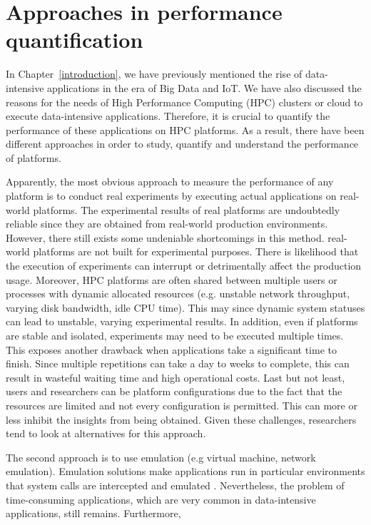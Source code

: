 \section{Approaches in performance quantification}

In Chapter~\ref{introduction}, we have previously mentioned the 
rise of data-intensive applications in the era of Big Data and IoT.
We have also discussed the reasons for the needs of High Performance 
Computing (HPC) clusters or cloud to execute data-intensive applications.
Therefore, it is crucial to quantify the performance of these applications 
on HPC platforms. As a result, there have been different approaches 
in order to study, quantify and understand the performance of platforms.

Apparently, the most obvious approach to measure the performance 
of any platform is to conduct real experiments by executing actual 
applications on real-world platforms. 
The experimental results of real platforms are undoubtedly reliable 
since they are obtained from real-world production environments. 
However, there still exists some undeniable shortcomings in this method. 
 real-world platforms are not built for 
experimental purposes. 
There is likelihood that the execution of experiments can interrupt 
or detrimentally affect the production usage. 
Moreover, HPC platforms are often shared between multiple users or processes 
with dynamic allocated resources (e.g. unstable network throughput,  
varying disk bandwidth, idle CPU time). 
This may  since 
dynamic system statuses can lead to unstable, varying experimental results. 
In addition, even if platforms are stable and isolated, experiments may need 
to be executed multiple times. 
This exposes another drawback when applications take a significant time 
to finish. Since multiple repetitions can take a day to weeks to complete, 
this can result in wasteful waiting time and high operational costs.  
Last but not least, users and researchers can be  platform 
configurations due to the fact that the resources are limited and 
not every configuration is permitted. This can more or less 
inhibit the insights from being obtained. 
Given these challenges, researchers tend to look at alternatives 
for this approach. 

The second approach is to use emulation (e.g virtual machine, 
network emulation). Emulation solutions make applications run 
in particular environments that system calls are intercepted 
and emulated \cite{casanova2008simgrid}. 
Nevertheless, the problem of time-consuming applications, 
which are very common in data-intensive applications, still remains. 
Furthermore, 

